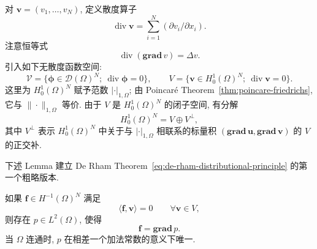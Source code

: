 对 $\mathbf v=(v_1,\ldots,v_N)$, 定义散度算子
\[
\operatorname{div}\mathbf v=\sum_{i=1}^N(\partial v_i/\partial x_i).
\]
注意恒等式
\[
\operatorname{div}(\mathbf{grad}\,v)=\Delta v.
\]
引入如下无散度函数空间:
\[
\mathcal V=\{\boldsymbol\phi\in\mathcal D(\Omega)^N;\ \operatorname{div}\boldsymbol\phi=0\},
\qquad
V=\{\mathbf v\in H_0^1(\Omega)^N;\ \operatorname{div}\mathbf v=0\}.
\]
这里为 $H_0^1(\Omega)^N$ 赋予范数 $|\cdot|_{1,\Omega}$; 由
Poincaré Theorem~\ref{thm:poincare-friedrichs}, 它与 $\|\cdot\|_{1,\Omega}$ 等价.
由于 $V$ 是 $H_0^1(\Omega)^N$ 的闭子空间, 有分解
\[
H_0^1(\Omega)^N=V\oplus V^\perp,
\]
其中 $V^\perp$ 表示 $H_0^1(\Omega)^N$ 中关于与 $|\cdot|_{1,\Omega}$ 相联系的标量积
$(\mathbf{grad}\,\mathbf u,\mathbf{grad}\,\mathbf v)$ 的 $V$ 的正交补.

下述 Lemma 建立 De Rham Theorem~\eqref{eq:de-rham-distributional-principle} 的第一个粗略版本.

\setcounter{statement}{0}
\renewcommand{\theHstatement}{lemma.\thesection.\arabic{statement}}
\begin{Lemma}\label{lem:sec2-hminus1-gradient-coarse}
如果 $\mathbf f\in H^{-1}(\Omega)^N$ 满足
\begin{equation}\label{eq:sec2-annihilates-v}
\langle\mathbf f,\mathbf v\rangle=0\qquad\forall\mathbf v\in V,
\end{equation}
则存在 $p\in L^2(\Omega)$, 使得
\[
\mathbf f=\mathbf{grad}\,p.
\]
当 $\Omega$ 连通时, $p$ 在相差一个加法常数的意义下唯一.
\end{Lemma}
